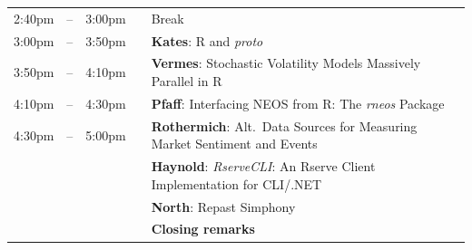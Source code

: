 \documentclass[11pt]{article}
\newcommand{\mylinecolor}[1]{\color{#1}\vspace{-8pt}}  %
\begin{document}
\begin{tabular}{rlrlp{5in}}
   2:40pm & -- & 3:00pm  &   & \small{\mylinecolor{Breaks} Break} \\
   3:00pm & -- & 3:50pm  &   & \textbf{\color{KeynoteTalk} Kates}: \small{R and \emph{proto}} \\
   3:50pm & -- & 4:10pm  &   & \textbf{\color{Talk} Vermes}: \small{Stochastic Volatility Models Massively Parallel in R} \\
   4:10pm & -- & 4:30pm  &   & \textbf{\color{Talk} Pfaff}: \small{Interfacing NEOS from R: The \emph{rneos} Package} \\
   4:30pm & -- & 5:00pm  &   & \textbf{\color{LightningTalk} Rothermich}: \small{Alt.~Data Sources for Measuring Market Sentiment and Events} \\
          &    &        &    & \textbf{\color{LightningTalk} Haynold}: \small{\emph{RserveCLI}: An Rserve Client Implementation for CLI/.NET} \\
          &    &         &   & \textbf{\color{LightningTalk} North}: \small{Repast Simphony} \\
          &    &         &   & \textbf{\color{Breaks} Closing remarks} \\
\end{tabular}
\end{document}
